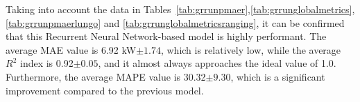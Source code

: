 
Taking into account the data in Tables~\ref{tab:grrunpmaer},\ref{tab:grrunglobalmetrics},\ref{tab:grrunpmaerlungo} and \ref{tab:grrunglobalmetricsranging}, it can be confirmed that this
Recurrent Neural Network-based model is highly performant.
The average MAE value is 6.92 kW$\pm 1.74$, which is relatively low, while the average $R^2$ index is 0.92$\pm 0.05$, and it almost always approaches the ideal value of 1.0\cite{metrics}. Furthermore, the average MAPE value is 30.32$\pm 9.30$, which is a significant improvement compared to the previous model.

